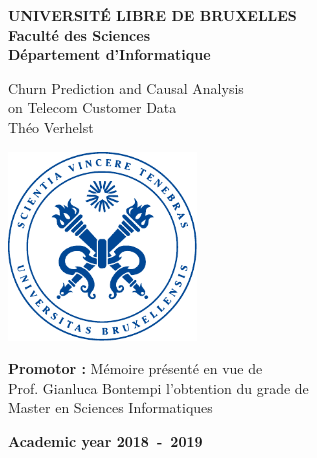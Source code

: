 \clearpage
\thispagestyle{empty}

{\centering
\textbf{
    UNIVERSIT\'E LIBRE DE BRUXELLES\\
    Faculté des Sciences\\
    Département d'Informatique
}

\vfill{}

{\Huge Churn Prediction and Causal Analysis \\ on Telecom Customer Data\\}
\vspace{0.5cm}
{\LARGE Théo Verhelst}

\vfill{}

\includegraphics[width=5cm]{figures/seal.pdf}

\vfill{}

\begin{flushleft}
    {\large
    \textbf{Promotor :}     \hfill{} Mémoire présenté en vue de\\
    Prof. Gianluca Bontempi \hfill{} l’obtention du grade de \\
                            \hfill{} Master en Sciences Informatiques
    }
\end{flushleft}

\enlargethispage{1.5cm}
\vfill{}

\textbf{Academic year 2018~-~2019}\par
}

\cleartorecto

